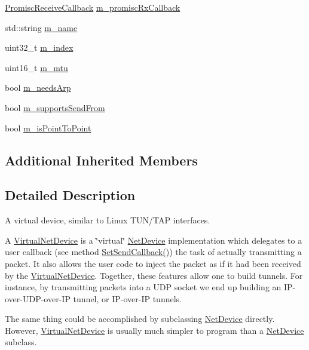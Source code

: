 \begin{DoxyCompactItemize}
\item 
\hyperlink{classns3_1_1NetDevice_a427225795919f26c414bee2ea3f31ed2}{Promisc\+Receive\+Callback} \hyperlink{classns3_1_1VirtualNetDevice_adaab3f043b0241d58ccdb9ba7ba7587e}{m\+\_\+promisc\+Rx\+Callback}
\item 
std\+::string \hyperlink{classns3_1_1VirtualNetDevice_adb3560f38c365a7fda84caf403c4326c}{m\+\_\+name}
\item 
uint32\+\_\+t \hyperlink{classns3_1_1VirtualNetDevice_a2f1e2e67cf29cc3fd446e2d9c410e9fc}{m\+\_\+index}
\item 
uint16\+\_\+t \hyperlink{classns3_1_1VirtualNetDevice_a3df667e5920ae7bde13ce2f30a4a2bbd}{m\+\_\+mtu}
\item 
bool \hyperlink{classns3_1_1VirtualNetDevice_a6d5b194341bd76b5c99e4c01616fb788}{m\+\_\+needs\+Arp}
\item 
bool \hyperlink{classns3_1_1VirtualNetDevice_aac37389af138f3fae76a3219f9e69869}{m\+\_\+supports\+Send\+From}
\item 
bool \hyperlink{classns3_1_1VirtualNetDevice_af59a3ce1a68aa62f1bded3e131440cbc}{m\+\_\+is\+Point\+To\+Point}
\end{DoxyCompactItemize}
\subsection*{Additional Inherited Members}


\subsection{Detailed Description}
A virtual device, similar to Linux T\+U\+N/\+T\+AP interfaces. 

A \hyperlink{classns3_1_1VirtualNetDevice}{Virtual\+Net\+Device} is a \char`\"{}virtual\char`\"{} \hyperlink{classns3_1_1NetDevice}{Net\+Device} implementation which delegates to a user callback (see method \hyperlink{classns3_1_1VirtualNetDevice_ae4e54639e40bf1c5d8d6ed7da9ababed}{Set\+Send\+Callback()}) the task of actually transmitting a packet. It also allows the user code to inject the packet as if it had been received by the \hyperlink{classns3_1_1VirtualNetDevice}{Virtual\+Net\+Device}. Together, these features allow one to build tunnels. For instance, by transmitting packets into a U\+DP socket we end up building an I\+P-\/over-\/\+U\+D\+P-\/over-\/\+IP tunnel, or I\+P-\/over-\/\+IP tunnels.

The same thing could be accomplished by subclassing \hyperlink{classns3_1_1NetDevice}{Net\+Device} directly. However, \hyperlink{classns3_1_1VirtualNetDevice}{Virtual\+Net\+Device} is usually much simpler to program than a \hyperlink{classns3_1_1NetDevice}{Net\+Device} subclass. 

